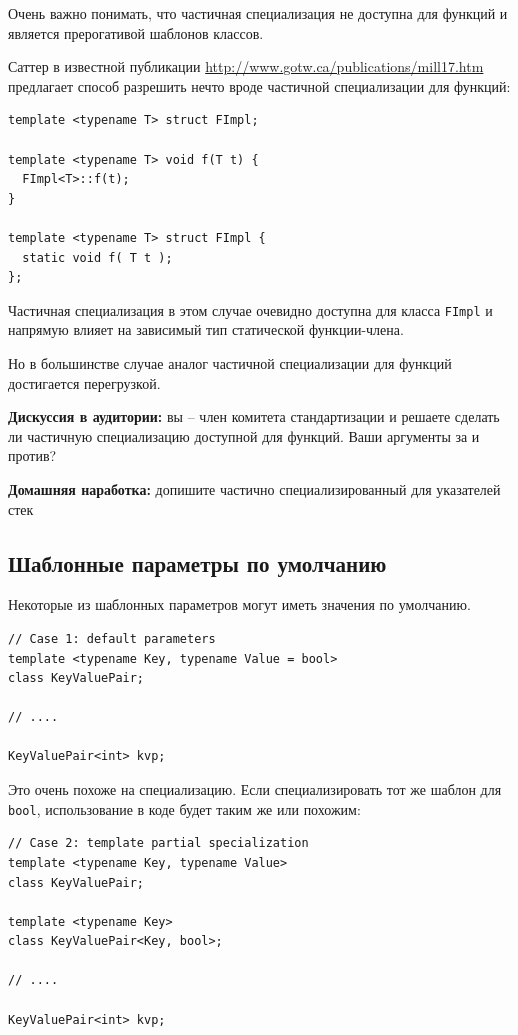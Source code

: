 \documentclass[a4paper,12pt,oneside]{book}
\begin{document}
Очень важно понимать, что частичная специализация не доступна для функций и является прерогативой шаблонов классов.

Саттер в известной публикации \url{http://www.gotw.ca/publications/mill17.htm} предлагает способ разрешить нечто вроде частичной специализации для функций:

\begin{lstlisting}
template <typename T> struct FImpl;

template <typename T> void f(T t) { 
  FImpl<T>::f(t);
} 

template <typename T> struct FImpl { 
  static void f( T t ); 
};
\end{lstlisting}

Частичная специализация в этом случае очевидно доступна для класса \lstinline!FImpl! и напрямую влияет на зависимый тип статической функции-члена.

Но в большинстве случае аналог частичной специализации для функций достигается перегрузкой.

\textbf{Дискуссия в аудитории:} вы -- член комитета стандартизации и решаете сделать ли частичную специализацию доступной для функций. Ваши аргументы за и против?

\textbf{Домашняя наработка:} допишите частично специализированный для указателей стек

\subsection{Шаблонные параметры по умолчанию}

Некоторые из шаблонных параметров могут иметь значения по умолчанию.

\begin{lstlisting}
// Case 1: default parameters
template <typename Key, typename Value = bool>
class KeyValuePair;

// ....

KeyValuePair<int> kvp;
\end{lstlisting}

Это очень похоже на специализацию. Если специализировать тот же шаблон для \lstinline!bool!, использование в коде будет таким же или похожим:

\begin{lstlisting}
// Case 2: template partial specialization
template <typename Key, typename Value>
class KeyValuePair;

template <typename Key>
class KeyValuePair<Key, bool>;

// ....

KeyValuePair<int> kvp;
\end{lstlisting}
\end{document}
